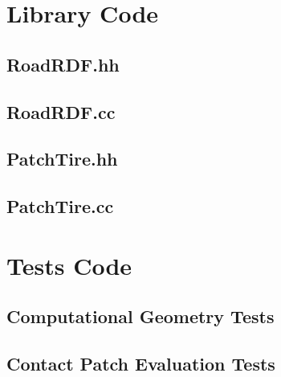 \chapter{Library Code}
\label{LibraryCode}
%
\section{RoadRDF.hh}

%
\section{RoadRDF.cc}

%
\section{PatchTire.hh}

%
\section{PatchTire.cc}

%
\chapter{Tests Code}
\label{TestsCode}
%
\section{Computational Geometry Tests}
%
%
%
\section{Contact Patch Evaluation Tests}
%
%